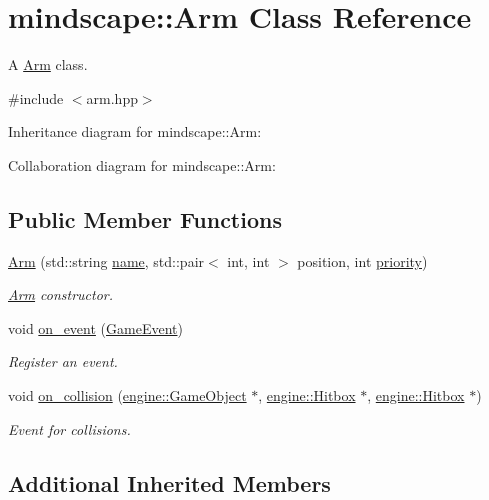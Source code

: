 \hypertarget{classmindscape_1_1_arm}{}\section{mindscape\+:\+:Arm Class Reference}
\label{classmindscape_1_1_arm}


A \hyperlink{classmindscape_1_1_arm}{Arm} class.  




{\ttfamily \#include $<$arm.\+hpp$>$}



Inheritance diagram for mindscape\+:\+:Arm\+:


Collaboration diagram for mindscape\+:\+:Arm\+:
\subsection*{Public Member Functions}
\begin{DoxyCompactItemize}
\item 
\hyperlink{classmindscape_1_1_arm_a1fbc9ae5b007132b16ad08e1d3695aeb}{Arm} (std\+::string \hyperlink{classengine_1_1_game_object_a1f104f7af4f351e6d3278319762c9fe5}{name}, std\+::pair$<$ int, int $>$ position, int \hyperlink{classengine_1_1_game_object_a159ecaca30229e302793b11a75bd13c2}{priority})
\begin{DoxyCompactList}\small\item\em \hyperlink{classmindscape_1_1_arm}{Arm} constructor. \end{DoxyCompactList}\item 
void \hyperlink{classmindscape_1_1_arm_ae39e38ffd5567cd28202f51ee253b787}{on\+\_\+event} (\hyperlink{class_game_event}{Game\+Event})
\begin{DoxyCompactList}\small\item\em Register an event. \end{DoxyCompactList}\item 
void \hyperlink{classmindscape_1_1_arm_ac30e41db231cbf4be054dbe89572264b}{on\+\_\+collision} (\hyperlink{classengine_1_1_game_object}{engine\+::\+Game\+Object} $\ast$, \hyperlink{classengine_1_1_hitbox}{engine\+::\+Hitbox} $\ast$, \hyperlink{classengine_1_1_hitbox}{engine\+::\+Hitbox} $\ast$)
\begin{DoxyCompactList}\small\item\em Event for collisions. \end{DoxyCompactList}\end{DoxyCompactItemize}
\subsection*{Additional Inherited Members}


